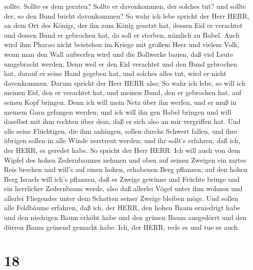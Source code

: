 sollte. Sollte es dem geraten? Sollte er davonkommen, der solches tut?
und sollte der, so den Bund bricht davonkommen?  So wahr
ich lebe spricht der Herr HERR, an dem Ort des Königs, der ihn zum König
gesetzt hat, dessen Eid er verachtet und dessen Bund er gebrochen hat,
da soll er sterben, nämlich zu Babel.  Auch wird ihm Pharao
nicht beistehen im Kriege mit großem Heer und vielem Volk, wenn man den
Wall aufwerfen wird und die Bollwerke bauen, daß viel Leute umgebracht
werden.  Denn weil er den Eid verachtet und den Bund
gebrochen hat, darauf er seine Hand gegeben hat, und solches alles tut,
wird er nicht davonkommen.  Darum spricht der Herr HERR
also; So wahr ich lebe, so will ich meinen Eid, den er verachtet hat,
und meinen Bund, den er gebrochen hat, auf seinen Kopf bringen.
 Denn ich will mein Netz über ihn werfen, und er muß in
meinem Garn gefangen werden; und ich will ihn gen Babel bringen und will
daselbst mit ihm rechten über dem, daß er sich also an mir vergriffen
hat.  Und alle seine Flüchtigen, die ihm anhingen, sollen
durchs Schwert fallen, und ihre übrigen sollen in alle Winde zerstreut
werden; und ihr sollt's erfahren, daß ich, der HERR, es geredet habe.
 So spricht der Herr HERR: Ich will auch von dem Wipfel des
hohen Zedernbaumes nehmen und oben auf seinen Zweigen ein zartes Reis
brechen und will's auf einen hohen, erhabenen Berg pflanzen;
 auf den hohen Berg Israels will ich's pflanzen, daß es
Zweige gewinne und Früchte bringe und ein herrlicher Zedernbaum werde,
also daß allerlei Vögel unter ihm wohnen und allerlei Fliegendes unter
dem Schatten seiner Zweige bleiben möge.  Und sollen alle
Feldbäume erfahren, daß ich, der HERR, den hohen Baum erniedrigt habe
und den niedrigen Baum erhöht habe und den grünen Baum ausgedörrt und
den dürren Baum grünend gemacht habe. Ich, der HERR, rede es und tue es
auch.

\hypertarget{section-17}{%
\section{18}\label{section-17}}

